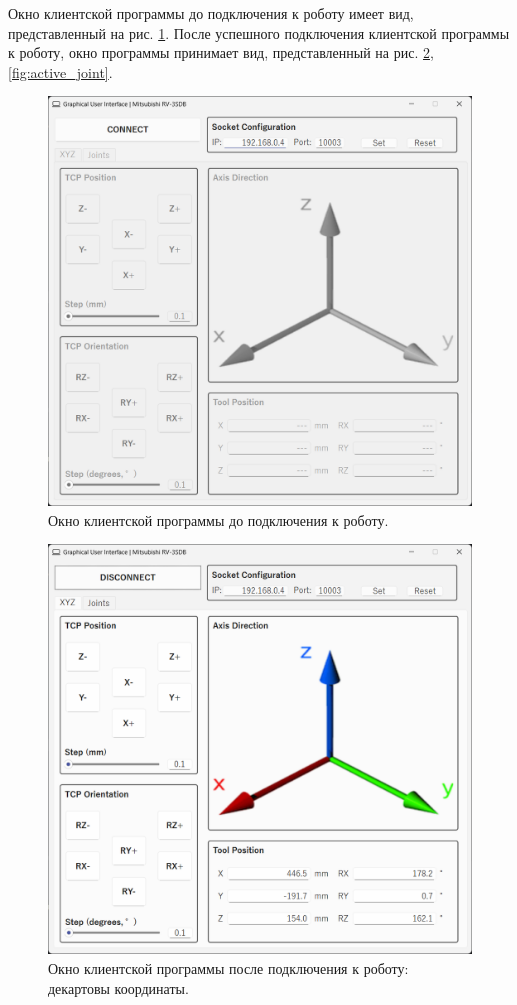 \documentclass[a4paper,14pt]{extarticle}
\begin{document}
Окно клиентской программы до подключения к роботу имеет вид, представленный на рис. \ref{fig:nonactive}.
После успешного подключения клиентской программы к роботу, окно
программы принимает вид, представленный на рис. \ref{fig:active_cartesian}, \ref{fig:active_joint}.
\begin{figure}[H]
    \centering
    \includegraphics[scale=0.5]{nonactive.png}
    \caption{Окно клиентской программы до подключения к роботу.}
    \label{fig:nonactive}
\end{figure}
\begin{figure}[H]
    \centering
    \includegraphics[scale=0.5]{active_cartesian.png}
    \caption{Окно клиентской программы после подключения к роботу: декартовы координаты.}
    \label{fig:active_cartesian}
\end{figure}
\end{document}
